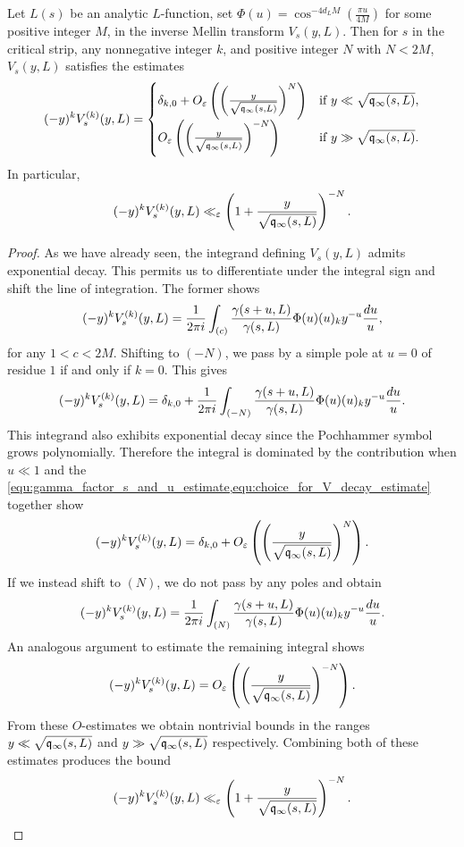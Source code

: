     \begin{proposition}\label{prop:V_function_decay}
      Let \(L(s)\) be an analytic \(L\)-function, set \(\Phi(u) = \cos^{-4d_{L}M}\left(\frac{\pi u}{4M}\right)\) for some positive integer \(M\), in the inverse Mellin transform \(V_{s}(y,L)\). Then for \(s\) in the critical strip, any nonnegative integer \(k\), and positive integer \(N\) with \(N < 2M\), \(V_{s}(y,L)\) satisfies the estimates
      \[
        (-y)^{k}V_{s}^{(k)}(y,L) = \begin{cases} \delta_{k,0}+O_{\varepsilon}\left(\left(\frac{y}{\sqrt{\mathfrak{q}_{\infty}(s,L)}}\right)^{N}\right) & \text{if \(y \ll \sqrt{\mathfrak{q}_{\infty}(s,L)}\)}, \\ O_{\varepsilon}\left(\left(\frac{y}{\sqrt{\mathfrak{q}_{\infty}(s,L)}}\right)^{-N}\right) & \text{if \(y \gg \sqrt{\mathfrak{q}_{\infty}(s,L)}\)}. \end{cases}
      \]
      In particular,
      \[
        (-y)^{k}V_{s}^{(k)}(y,L) \ll_{\varepsilon} \left(1+\frac{y}{\sqrt{\mathfrak{q}_{\infty}(s,L)}}\right)^{-N}.
      \]
    \end{proposition}
    \begin{proof}
      As we have already seen, the integrand defining \(V_{s}(y,L)\) admits exponential decay. This permits us to differentiate under the integral sign and shift the line of integration. The former shows
      \[
        (-y)^{k}V_{s}^{(k)}(y,L) = \frac{1}{2\pi i}\int_{(c)}\frac{\gamma(s+u,L)}{\gamma(s,L)}\Phi(u)(u)_{k}y^{-u}\frac{du}{u},
      \]
      for any \(1 < c < 2M\). Shifting to \((-N)\), we pass by a simple pole at \(u = 0\) of residue \(1\) if and only if \(k = 0\). This gives
      \[
        (-y)^{k}V_{s}^{(k)}(y,L) = \delta_{k,0}+\frac{1}{2\pi i}\int_{(-N)}\frac{\gamma(s+u,L)}{\gamma(s,L)}\Phi(u)(u)_{k}y^{-u}\frac{du}{u}.
      \]
      This integrand also exhibits exponential decay since the Pochhammer symbol grows polynomially. Therefore the integral is dominated by the contribution when \(u \ll 1\) and the \cref{equ:gamma_factor_s_and_u_estimate,equ:choice_for_V_decay_estimate} together show
      \[
        (-y)^{k}V_{s}^{(k)}(y,L) = \delta_{k,0}+O_{\varepsilon}\left(\left(\frac{y}{\sqrt{\mathfrak{q}_{\infty}(s,L)}}\right)^{N}\right).
      \]
      If we instead shift to \((N)\), we do not pass by any poles and obtain
      \[
        (-y)^{k}V_{s}^{(k)}(y,L) = \frac{1}{2\pi i}\int_{(N)}\frac{\gamma(s+u,L)}{\gamma(s,L)}\Phi(u)(u)_{k}y^{-u}\frac{du}{u}.
      \]
      An analogous argument to estimate the remaining integral shows
      \[
        (-y)^{k}V_{s}^{(k)}(y,L) = O_{\varepsilon}\left(\left(\frac{y}{\sqrt{\mathfrak{q}_{\infty}(s,L)}}\right)^{-N}\right).
      \]
      From these \(O\)-estimates we obtain nontrivial bounds in the ranges \(y \ll \sqrt{\mathfrak{q}_{\infty}(s,L)}\) and \(y \gg \sqrt{\mathfrak{q}_{\infty}(s,L)}\) respectively. Combining both of these estimates produces the bound
      \[
        (-y)^{k}V_{s}^{(k)}(y,L) \ll_{\varepsilon} \left(1+\frac{y}{\sqrt{\mathfrak{q}_{\infty}(s,L)}}\right)^{-N}.
      \]
    \end{proof}

